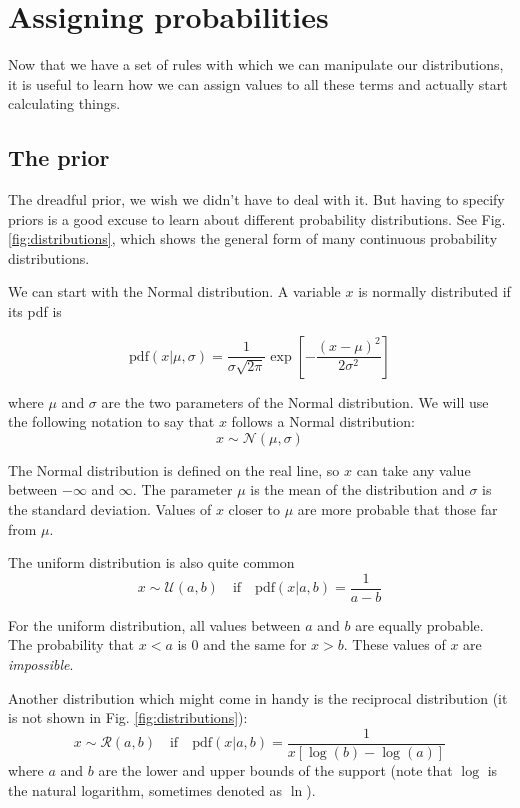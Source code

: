 \documentclass[a4paper,11pt]{article}
\begin{document}
\section{Assigning probabilities}

Now that we have a set of rules with which we can manipulate our distributions, it is useful to learn how we can assign values to all these terms and actually start calculating things.

\subsection{The prior}\label{sec:prior}

The dreadful prior, we wish we didn't have to deal with it. 
But having to specify priors is a good excuse to learn about different probability distributions. 
See Fig. \ref{fig:distributions}, which shows the general form of many continuous probability distributions.

We can start with the Normal distribution.
A variable $x$ is normally distributed if its pdf is

\begin{equation}
  \text{pdf}(x|\mu, \sigma) = \frac{1}{\sigma \sqrt{2\pi}} 
                              \exp\left[-\frac{(x-\mu)^2}{2\sigma^2}\right]
\end{equation}

where $\mu$ and $\sigma$ are the two parameters of the Normal distribution.
We will use the following notation to say that $x$ follows a Normal distribution:
%
\[x \sim \mathcal{N}(\mu, \sigma)\]
%

The Normal distribution is defined on the real line, so $x$ can take any value between $-\infty$ and $\infty$.
The parameter $\mu$ is the mean of the distribution and $\sigma$ is the standard deviation.
Values of $x$ closer to $\mu$ are more probable that those far from $\mu$.


The uniform distribution is also quite common
%
\begin{equation}
x \sim \mathcal{U}(a, b) \quad \text{if} \quad \text{pdf}(x|a,b) = \frac{1}{a-b}
\end{equation}
%

For the uniform distribution, all values between $a$ and $b$ are equally probable.
The probability that $x<a$ is 0 and the same for $x>b$. These values of $x$ are \emph{impossible}.


Another distribution which might come in handy is the reciprocal distribution (it is not shown in Fig. \ref{fig:distributions}):
%
\begin{equation}\label{eq:reciprocal}
x \sim \mathcal{R}(a, b) \quad \text{if} \quad \text{pdf}(x|a,b) = \frac{1}{x\left[\log(b) - \log(a) \right]}
\end{equation}
%
where $a$ and $b$ are the lower and upper bounds of the support (note that $\log$ is the natural logarithm, sometimes denoted as $\ln$).
\end{document}
